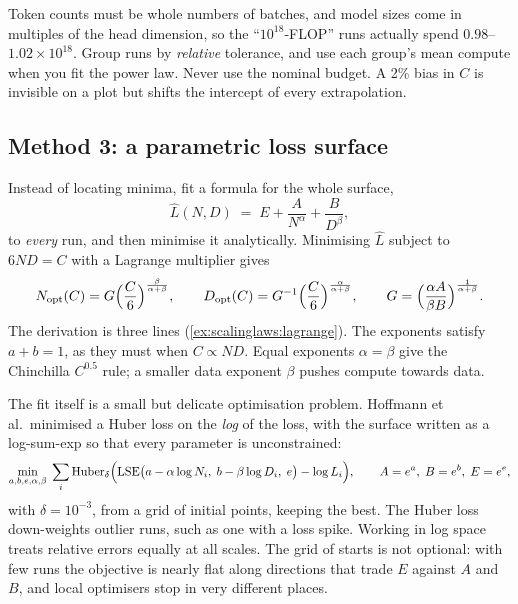 \begin{pitfall}
Token counts must be whole numbers of batches, and model sizes come in multiples of the head
dimension, so the ``$10^{18}$-FLOP'' runs actually spend $0.98$--$1.02\times10^{18}$. Group runs by
\emph{relative} tolerance, and use each group's mean compute when you fit the power law. Never use
the nominal budget. A 2\% bias in $C$ is invisible on a plot but shifts the intercept of every
extrapolation.
\end{pitfall}

\subsection{Method 3: a parametric loss surface}\label{sec:scalinglaws:method3}

Instead of locating minima, fit a formula for the whole surface,
\begin{equation}
\hat L(N,D) \;=\; E + \frac{A}{N^{\alpha}} + \frac{B}{D^{\beta}},
\label{eq:scalinglaws:chin}
\end{equation}
to \emph{every} run, and then minimise it analytically. Minimising $\hat L$ subject to $6ND = C$
with a Lagrange multiplier gives
\begin{equation}
N_{\text{opt}}(C) = G\Bigl(\frac{C}{6}\Bigr)^{\frac{\beta}{\alpha+\beta}},\qquad
D_{\text{opt}}(C) = G^{-1}\Bigl(\frac{C}{6}\Bigr)^{\frac{\alpha}{\alpha+\beta}},\qquad
G = \Bigl(\frac{\alpha A}{\beta B}\Bigr)^{\frac{1}{\alpha+\beta}}.
\label{eq:scalinglaws:closed}
\end{equation}
The derivation is three lines (\cref{ex:scalinglaws:lagrange}). The exponents satisfy
$a+b=1$, as they must when $C\propto ND$. Equal exponents $\alpha=\beta$ give the Chinchilla
$C^{0.5}$ rule; a smaller data exponent $\beta$ pushes compute towards data.

The fit itself is a small but delicate optimisation problem. Hoffmann et al.\ minimised a Huber
loss on the \emph{log} of the loss, with the surface written as a log-sum-exp so that every
parameter is unconstrained:
\begin{equation}
\min_{a,b,e,\alpha,\beta}\;\sum_i \mathrm{Huber}_\delta\Bigl(
\mathrm{LSE}\bigl(a-\alpha\log N_i,\; b-\beta\log D_i,\; e\bigr) - \log L_i\Bigr),
\qquad A=e^a,\;B=e^b,\;E=e^e,
\end{equation}
with $\delta=10^{-3}$, from a grid of initial points, keeping the best. The Huber loss down-weights
outlier runs, such as one with a loss spike. Working in log space treats relative errors equally at
all scales. The grid of starts is not optional: with few runs the objective is nearly flat along
directions that trade $E$ against $A$ and $B$, and local optimisers stop in very different places.

